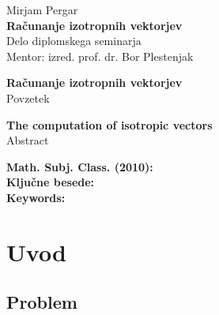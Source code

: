 \documentclass[12pt,a4paper]{amsart}
\theoremstyle{definition}
\theoremstyle{plain}
\begin{document}
\thispagestyle{empty}
\vfill

\begin{center}{\large
Mirjam Pergar\\[2mm]
{\bf Računanje izotropnih vektorjev}\\[10mm]
Delo diplomskega seminarja\\[1cm]
Mentor: izred. prof. dr. Bor Plestenjak}
\end{center}
\vfill

\pagebreak

\thispagestyle{empty}
\tableofcontents
\pagebreak

\thispagestyle{empty}
\begin{center}
{\bf Računanje izotropnih vektorjev}\\[3mm]
{\sc Povzetek}
\end{center}

\vfill
\begin{center}
{\bf The computation of isotropic vectors}\\[3mm]
{\sc Abstract}
\end{center}

\vfill\noindent
{\bf Math. Subj. Class. (2010):}   \\[1mm]
{\bf Ključne besede:}   \\[1mm]
{\bf Keywords:}
\pagebreak


\section{Uvod}
\subsection{Problem}
\end{document}
